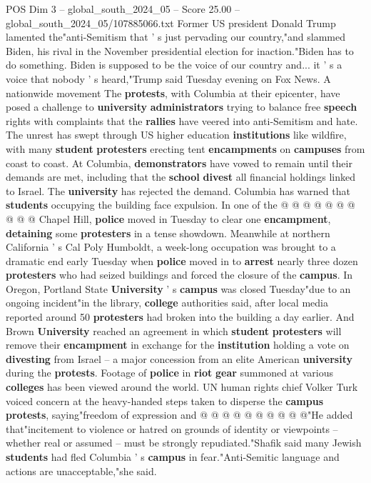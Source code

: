 \begin{textsample}{POS Dim 3 – global\_south\_2024\_05 – Score 25.00 – global\_south\_2024\_05/107885066.txt}
Former US president Donald Trump lamented the"anti-Semitism that ' s just pervading our country,"and slammed Biden, his rival in the November presidential election for inaction."Biden has to do something.
Biden is supposed to be the voice of our country and... it ' s a voice that nobody ' s heard,"Trump said Tuesday evening on Fox News.
A nationwide movement The \textbf{protests}, with Columbia at their epicenter, have posed a challenge to \textbf{university} \textbf{administrators} trying to balance free \textbf{speech} rights with complaints that the \textbf{rallies} have veered into anti-Semitism and hate.
The unrest has swept through US higher education \textbf{institutions} like wildfire, with many \textbf{student} \textbf{protesters} erecting tent \textbf{encampments} on \textbf{campuses} from coast to coast.
At Columbia, \textbf{demonstrators} have vowed to remain until their demands are met, including that the \textbf{school} \textbf{divest} all financial holdings linked to Israel.
The \textbf{university} has rejected the demand.
Columbia has warned that \textbf{students} occupying the building face expulsion.
In one of the @ @ @ @ @ @ @ @ @ @ Chapel Hill, \textbf{police} moved in Tuesday to clear one \textbf{encampment}, \textbf{detaining} some \textbf{protesters} in a tense showdown.
Meanwhile at northern California ' s Cal Poly Humboldt, a week-long occupation was brought to a dramatic end early Tuesday when \textbf{police} moved in to \textbf{arrest} nearly three dozen \textbf{protesters} who had seized buildings and forced the closure of the \textbf{campus}.
In Oregon, Portland State \textbf{University} ' s \textbf{campus} was closed Tuesday"due to an ongoing incident"in the library, \textbf{college} authorities said, after local media reported around 50 \textbf{protesters} had broken into the building a day earlier.
And Brown \textbf{University} reached an agreement in which \textbf{student} \textbf{protesters} will remove their \textbf{encampment} in exchange for the \textbf{institution} holding a vote on \textbf{divesting} from Israel -- a major concession from an elite American \textbf{university} during the \textbf{protests}.
Footage of \textbf{police} in \textbf{riot} \textbf{gear} summoned at various \textbf{colleges} has been viewed around the world.
UN human rights chief Volker Turk voiced concern at the heavy-handed steps taken to disperse the \textbf{campus} \textbf{protests}, saying"freedom of expression and @ @ @ @ @ @ @ @ @ @"He added that"incitement to violence or hatred on grounds of identity or viewpoints -- whether real or assumed -- must be strongly repudiated."Shafik said many Jewish \textbf{students} had fled Columbia ' s \textbf{campus} in fear."Anti-Semitic language and actions are unacceptable,"she said.

\end{textsample}
